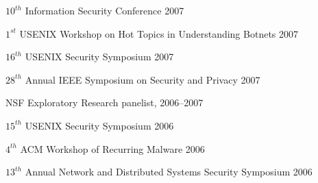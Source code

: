 \documentclass[11pt]{article}
\begin{document}
\begin{itemize}
{\item $10^{th}$ Information Security Conference \hfill 2007

\item $1^{st}$ USENIX Workshop on Hot Topics in Understanding Botnets
 \hfill 2007

\item $16^{th}$ {USENIX} Security Symposium \hfill 2007

\item $28^{th}$ Annual IEEE Symposium on Security and Privacy \hfill 2007

\item NSF Exploratory Research panelist, \hfill 2006--2007

\item $15^{th}$ {USENIX} Security Symposium \hfill 2006

\item $4^{th}$ ACM Workshop of Recurring Malware \hfill 2006

\item $13^{th}$ Annual Network and Distributed Systems Security
 Symposium \hfill 2006

}












\end{itemize}
\end{document}
